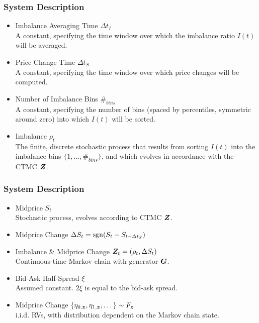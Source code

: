 \begin{frame}
\frametitle{System Description}
\begin{itemize}
\item Imbalance Averaging Time $\Delta {t_{I}}$ \\
    A constant, specifying the time window over which the imbalance ratio $I(t)$ will be averaged.
\item Price Change Time $\Delta {t_{S}}$ \\
    A constant, specifying the time window over which price changes will be computed.
\item Number of Imbalance Bins $\#_{bins}$ \\ 
    A constant, specifying the number of bins (spaced by percentiles, symmetric around zero) into which $I(t)$ will be sorted.
\item Imbalance $\rho_t$ \\
    The finite, discrete stochastic process that results from sorting $I(t)$ into the imbalance bins $\{1, \dots, \#_{bins} \}$, and which evolves in accordance with the CTMC $\bm{Z}$.
\end{itemize}
\end{frame}

\begin{frame}
\frametitle{System Description}
\begin{itemize}
\item Midprice $S_t$ \\
    Stochastic process, evolves according to CTMC $\bm{Z}$.
\item Midprice Change $\Delta S_t = \operatorname{\mathrm{sgn}}(S_t - S_{t-\Delta {t_{S}}})$
\item Imbalance \& Midprice Change $\bm{Z}_t = (\rho_t, \Delta S_t) $ \\
    Continuous-time Markov chain with generator $\boldsymbol{G}$.
\item Bid-Ask Half-Spread $\xi$ \\
    Assumed constant. $2\xi$ is equal to the bid-ask spread.
\item Midprice Change $\{ \eta_{0,\bm{z}}, \eta_{1,\bm{z}}, \dots \} \sim F_{\bm{z}}$ \\
    i.i.d. RVs, with distribution dependent on the Markov chain state.
\end{itemize}
\end{frame}

